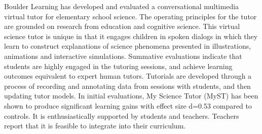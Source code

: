 Boulder Learning has developed and evaluated a conversational multimedia virtual tutor for elementary school science. The operating principles for the tutor are grounded on research from education and cognitive science. This virtual science tutor is unique in that it engages children in spoken dialogs in which they learn to construct explanations of science phenomena presented in illustrations, animations and interactive simulations. Summative evaluations indicate that students are highly engaged in the tutoring sessions, and achieve learning outcomes equivalent to expert human tutors. Tutorials are developed through a process of recording and annotating data from sessions with students, and then updating tutor models. In initial evaluations, My Science Tutor (MyST) has been shown to produce significant learning gains with effect size d=0.53 compared to controls. It is enthusiastically supported by students and teachers. Teachers report that it is feasible to integrate into their curriculum.
